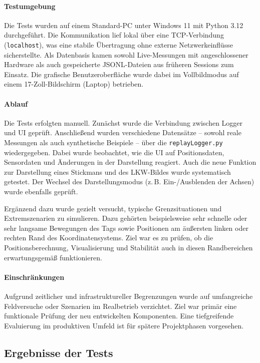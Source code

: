 \documentclass[a4paper, 12pt]{article} %
\begin{document}
\paragraph{Testumgebung}
Die Tests wurden auf einem Standard-PC unter Windows 11 mit Python 3.12 durchgeführt. Die Kommunikation lief lokal über eine \ac{TCP}-Verbindung 
(\texttt{localhost}), was eine stabile Übertragung ohne externe Netzwerkeinflüsse sicherstellte. Als Datenbasis kamen sowohl Live-Messungen mit 
angeschlossener Hardware als auch gespeicherte \ac{JSONL}-Dateien aus früheren Sessions zum Einsatz. Die grafische Benutzeroberfläche wurde dabei im 
Vollbildmodus auf einem 17-Zoll-Bildschirm (Laptop) betrieben.

\paragraph{Ablauf}
Die Tests erfolgten manuell. Zunächst wurde die Verbindung zwischen Logger und UI geprüft. Anschließend wurden verschiedene Datensätze -- sowohl reale
Messungen als auch synthetische Beispiele -- über die \texttt{replayLogger.py} wiedergegeben. Dabei wurde beobachtet, wie die \ac{UI} auf Positionsdaten, 
Sensordaten und Änderungen in der Darstellung reagiert. Auch die neue Funktion zur Darstellung eines Stickmans und des \ac{LKW}-Bildes wurde systematisch 
getestet. Der Wechsel des Darstellungsmodus (z.\,B. Ein-/Ausblenden der Achsen) wurde ebenfalls geprüft.

Ergänzend dazu wurde gezielt versucht, typische Grenzsituationen und Extremszenarien zu simulieren. Dazu gehörten beispielsweise sehr schnelle oder 
sehr langsame Bewegungen des Tags sowie Positionen am äußersten linken oder rechten Rand des Koordinatensystems. Ziel war es zu prüfen, ob die 
Positionsberechnung, Visualisierung und Stabilität auch in diesen Randbereichen erwartungsgemäß funktionieren.

\paragraph{Einschränkungen}
Aufgrund zeitlicher und infrastruktureller Begrenzungen wurde auf umfangreiche Feldversuche oder Szenarien im Realbetrieb verzichtet. Ziel 
war primär eine funktionale Prüfung der neu entwickelten Komponenten. Eine tiefgreifende Evaluierung im produktiven Umfeld ist für spätere 
Projektphasen vorgesehen.

\subsection{Ergebnisse der Tests}
\end{document}
